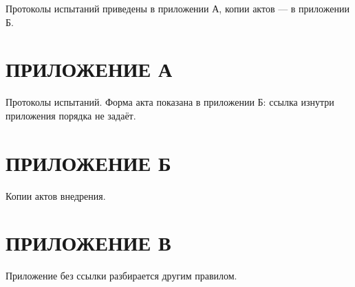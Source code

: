 

Протоколы испытаний приведены в приложении А, копии актов — в приложении Б.

\newpage
\section*{ПРИЛОЖЕНИЕ А}

Протоколы испытаний. Форма акта показана в приложении Б: ссылка изнутри
приложения порядка не задаёт.

\newpage
\section*{ПРИЛОЖЕНИЕ Б}

Копии актов внедрения.

\newpage
\section*{ПРИЛОЖЕНИЕ В}

Приложение без ссылки разбирается другим правилом.


